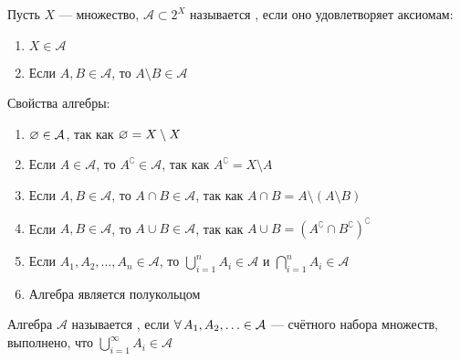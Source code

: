 \begin{opr}
	Пусть $X$ --- множество, $\mathcal{A} \subset 2^X$ называется  , если оно удовлетворяет аксиомам:
	\begin{enumerate}
		\item $X \in \mathcal{A}$
		\item\label{акс.2 алг} Если $A, B \in \mathcal{A}$, то $A \setminus B \in \mathcal{A}$
	\end{enumerate}
	\hspace{20pt}Свойства алгебры:
	\begin{enumerate}
		\item\label{св-во1алг} $\varnothing \in \mathcal{A}$, так как $\varnothing = X \setminus X$
		
		\item\label{св-во про доп.} Если $A \in \mathcal{A}$, то $A^\complement \in \mathcal{A}$, так как $A^\complement = X \setminus A$
		
		\item\label{св-во3алг} Если $A, B \in \mathcal A$, то $A \cap B \in 
		\mathcal A$, так как $A \cap B = A \setminus (A \setminus B)$
		
		\item Если $A, B \in \mathcal A$, то $A \cup B \in 
		\mathcal A$, так как $A \cup B = \left(A^\complement \cap B^\complement\right)^\complement$ 
		
		\item Если $A_1, A_2, \ldots, A_n \in \mathcal{A}$, то $\bigcup\limits_{i = 1}^n A_i \in \mathcal{A}$ и $\bigcap\limits_{i = 1}^n A_i \in \mathcal{A}$ 
		
		\item Алгебра является полукольцом 
	\end{enumerate}
\end{opr}\pagebreak

\begin{opr}
	Алгебра $\mathcal A$ называется , если $\forall \, A_1, A_2, \ldots \in \mathcal{A}$ --- счётного набора множеств, выполнено, что $\bigcup\limits_{i = 1} ^{\infty} A_i \in \mathcal A$ 
\end{opr}

